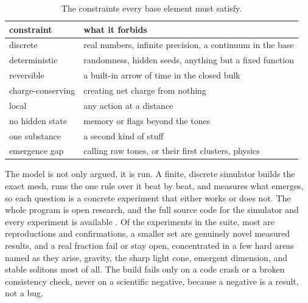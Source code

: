 \begin{table}[ht]
\centering
\begin{tabular}{@{}lp{}@{}}
\toprule
constraint & what it forbids \\
\midrule
discrete & real numbers, infinite precision, a continuum in the base \\
deterministic & randomness, hidden seeds, anything but a fixed function \\
reversible & a built-in arrow of time in the closed bulk \\
charge-conserving & creating net charge from nothing \\
local & any action at a distance \\
no hidden state & memory or flags beyond the tones \\
one substance & a second kind of stuff \\
emergence gap & calling raw tones, or their first clusters, physics \\
\bottomrule
\end{tabular}
\caption{The constraints every base element must satisfy.}
\label{tab:constraints}
\end{table}

The model is not only argued, it is run. A finite, discrete simulator builds the exact mesh, runs the one rule over it beat by beat, and measures what emerges, so each question is a concrete experiment that either works or does not. The whole program is open research, and the full source code for the simulator and every experiment is available \cite{cluesurf2026repo}. Of the experiments in the suite, most are reproductions and confirmations, a smaller set are genuinely novel measured results, and a real fraction fail or stay open, concentrated in a few hard areas named as they arise, gravity, the sharp light cone, emergent dimension, and stable solitons most of all. The build fails only on a code crash or a broken consistency check, never on a scientific negative, because a negative is a result, not a bug.
